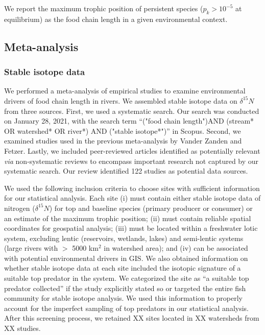 \documentclass[11pt, class=article, crop=false]{standalone}
\begin{document}
We report the maximum trophic position of persistent species ($p_k > 10^{-5}$ at equilibrium) as the food chain length in a given environmental context.

\subsection{Meta-analysis}

\subsubsection{Stable isotope data}

We performed a meta-analysis of empirical studies to examine environmental drivers of food chain length in rivers.
We assembled stable isotope data on $\delta^{15} N$ from three sources.
First, we used a systematic search. 
Our search was conducted on January 28, 2021, with the search term ``("food chain length")AND (stream* OR watershed* OR river*) AND ("stable isotope*")'' in Scopus.
Second, we examined studies used in the previous meta-analysis by Vander Zanden and Fetzer.
Lastly, we included peer-reviewed articles identified as potentially relevant \textit{via} non-systematic reviews to encompass important research not captured by our systematic search.
Our review identified 122 studies as potential data sources.

We used the following inclusion criteria to choose sites with sufficient information for our statistical analysis.
Each site (i) must contain either stable isotope data of nitrogen ($\delta^{15}N$) for top and baseline species (primary producer or consumer) or an estimate of the maximum trophic position; 
(ii) must contain reliable spatial coordinates for geospatial analysis; 
(iii) must be located within a freshwater lotic system, excluding lentic (reservoirs, wetlands, lakes) and semi-lentic systems (large rivers with $>$ 5000 km$^2$ in watershed area); and (iv) can be associated with potential environmental drivers in GIS.
We also obtained information on whether stable isotope data at each site included the isotopic signature of a suitable top predator in the system.
We categorized the site as ``a suitable top predator collected'' if the study explicitly stated so or targeted the entire fish community for stable isotope analysis.
We used this information to properly account for the imperfect sampling of top predators in our statistical analysis.
After this screening process, we retained XX sites located in XX watersheds from XX studies. 
\end{document}
